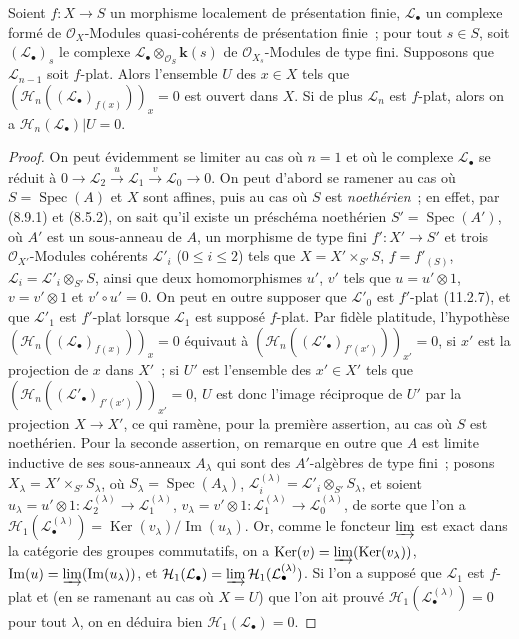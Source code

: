 \begin{proposition}[12.3.3]
\label{IV.12.3.3-fr}
Soient $f:X\to S$ un morphisme localement de présentation finie,
$\mathcal L_\bullet$ un complexe formé de $\mathcal O_X$-Modules
quasi-cohérents de présentation finie~; pour tout $s\in S$, soit
$(\mathcal L_\bullet)_s$ le complexe
$\mathcal L_\bullet\otimes_{\mathcal O_S}\boldsymbol{k}(s)$ de $\mathcal O_{X_s}$-Modules de
type fini. Supposons que $\mathcal L_{n-1}$ soit $f$-plat. Alors l'ensemble $U$
des $x\in X$ tels que $(\mathcal H_n((\mathcal L_\bullet)_{f(x)}))_x=0$ est
ouvert dans $X$. Si de plus $\mathcal L_n$ est $f$-plat, alors on a
$\mathcal H_n(\mathcal L_\bullet)|U=0$.
\end{proposition}

\begin{proof}
On peut évidemment se limiter au cas où $n=1$ et où le complexe
$\mathcal L_\bullet$ se réduit à
$0\to\mathcal L_2\xrightarrow{u}\mathcal L_1\xrightarrow{v}\mathcal L_0\to0$.
On peut d'abord se ramener au cas où $S=\operatorname{Spec}(A)$ et $X$
sont affines, puis au cas où $S$ est \emph{noethérien}~; en effet, par (8.9.1)
et (8.5.2), on sait qu'il existe un préschéma noethérien
$S'=\operatorname{Spec}(A')$, où $A'$ est un sous-anneau de $A$, un morphisme
de type fini $f':X'\to S'$ et trois $\mathcal O_{X'}$-Modules cohérents
$\mathcal L'_i$ ($0\leq i\leq2$) tels que $X=X'\times_{S'}S$,
$f=f'_{(S)}$, $\mathcal L_i=\mathcal L'_i\otimes_{S'}S$, ainsi que deux
homomorphismes $u'$, $v'$ tels que $u=u'\otimes1$, $v=v'\otimes1$ et
$v'\circ u'=0$. On peut en outre supposer que $\mathcal L'_0$ est $f'$-plat
(11.2.7), et que $\mathcal L'_1$ est $f'$-plat lorsque $\mathcal L_1$ est
supposé $f$-plat. Par fidèle platitude, l'hypothèse
$(\mathcal H_n((\mathcal L_\bullet)_{f(x)}))_x=0$ équivaut à
$(\mathcal H_n((\mathcal L'_\bullet)_{f'(x')}))_{x'}=0$, si $x'$ est la
projection de $x$ dans $X'$~; si $U'$ est l'ensemble des $x'\in X'$ tels que
$(\mathcal H_n((\mathcal L'_\bullet)_{f'(x')}))_{x'}=0$, $U$ est donc l'image
réciproque de $U'$ par la projection $X\to X'$, ce qui ramène, pour la première
assertion, au cas où $S$ est noethérien. Pour la seconde assertion, on remarque
en outre que $A$ est limite inductive de ses sous-anneaux $A_\lambda$ qui sont
des $A'$-algèbres de type fini~; posons
$X_\lambda=X'\times_{S'}S_\lambda$, où
$S_\lambda=\operatorname{Spec}(A_\lambda)$,
$\mathcal L_i^{(\lambda)}=\mathcal L'_i\otimes_{S'}S_\lambda$, et soient
$u_\lambda=u'\otimes1:\mathcal L_2^{(\lambda)}\to\mathcal L_1^{(\lambda)}$,
$v_\lambda=v'\otimes1:\mathcal L_1^{(\lambda)}\to\mathcal L_0^{(\lambda)}$,
de sorte que l'on a
$\mathcal H_1(\mathcal L_\bullet^{(\lambda)})
=\operatorname{Ker}(v_\lambda)/\operatorname{Im}(u_\lambda)$. Or, comme le
foncteur $\varinjlim$ est exact dans la catégorie des groupes commutatifs, on a
$\operatorname{Ker}(v)=\varinjlim(\operatorname{Ker}(v_\lambda))$,
$\operatorname{Im}(u)=\varinjlim(\operatorname{Im}(u_\lambda))$, et
$\mathcal H_1(\mathcal L_\bullet)
=\varinjlim\mathcal H_1(\mathcal L_\bullet^{(\lambda)})$. Si l'on a supposé
que $\mathcal L_1$ est $f$-plat et (en se ramenant au cas où $X=U$) que l'on
ait prouvé $\mathcal H_1(\mathcal L_\bullet^{(\lambda)})=0$ pour tout
$\lambda$, on en déduira bien $\mathcal H_1(\mathcal L_\bullet)=0$.


\end{proof}
